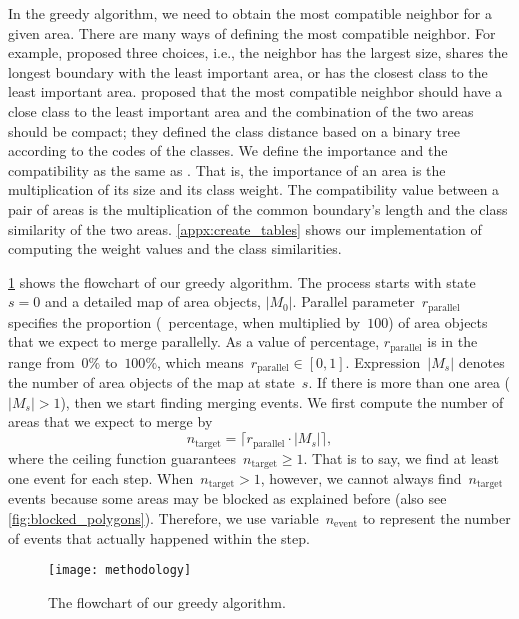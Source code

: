 \documentclass[]{interact}
\begin{document}
In the greedy algorithm, 
we need to obtain the most compatible neighbor for a given area.
There are many ways of defining the most compatible neighbor.
For example, \citet{Cheng2006} proposed three choices, i.e.,
the neighbor has the largest size, 
shares the longest boundary with the least important area,
or has the closest class to the least important area. 
\citet{Peng2017AStar} proposed that 
the most compatible neighbor should have a close class
to the least important area
and the combination of the two areas should be compact;
they defined the class distance based on a binary tree
according to the codes of the classes.
We define the importance and the compatibility as
the same as \citet{vanOosterom2005,vanPutten1998NewGAP}.
That is, the importance of an area is the multiplication 
of its size and its class weight.
The compatibility value between a pair of areas is 
the multiplication of the common boundary's length and 
the class similarity of the two areas.
\appx\ref{appx:create_tables} shows our implementation of
computing the weight values and the class similarities.



\fig\ref{fig:greedy_framework} shows the flowchart of our greedy algorithm.
The process starts with state~$s=0$ and a detailed map of area objects, $|M_0|$.
Parallel parameter~$r_\mathrm{parallel}$ specifies 
the proportion (\ie~percentage, when multiplied by~$100$) of area objects that
we expect to merge parallelly.
As a value of percentage, 
$r_\mathrm{parallel}$ is in the range from~$0\%$ to~$100\%$,
which means~$r_\mathrm{parallel} \in [0,1]$.
Expression~$|M_s|$ denotes the number of area objects of the map at state~$s$.
If there is more than one area ($|M_s|>1$),
then we start finding merging events.
We first compute the number of areas that we expect to merge by
\begin{equation}
\label{eq:n_target}
n_\mathrm{target} =
\lceil r_\mathrm{parallel} \cdot |M_s| \rceil,
\end{equation}
where the ceiling function guarantees~$n_\mathrm{target}\ge 1$.
That is to say, we find at least one event for each step.
When~$n_\mathrm{target} > 1$, however,
we cannot always find~$n_\mathrm{target}$ events
because some areas may be blocked as explained before
(also see \fig\ref{fig:blocked_polygons}).
Therefore, we use variable~$n_\mathrm{event}$
to represent the number of events that actually happened within the step. 


\begin{figure}[tb]
\centering
\texttt{[image: methodology]}
\caption{The flowchart of our greedy algorithm.
}
\label{fig:greedy_framework}
\end{figure}
\end{document}
